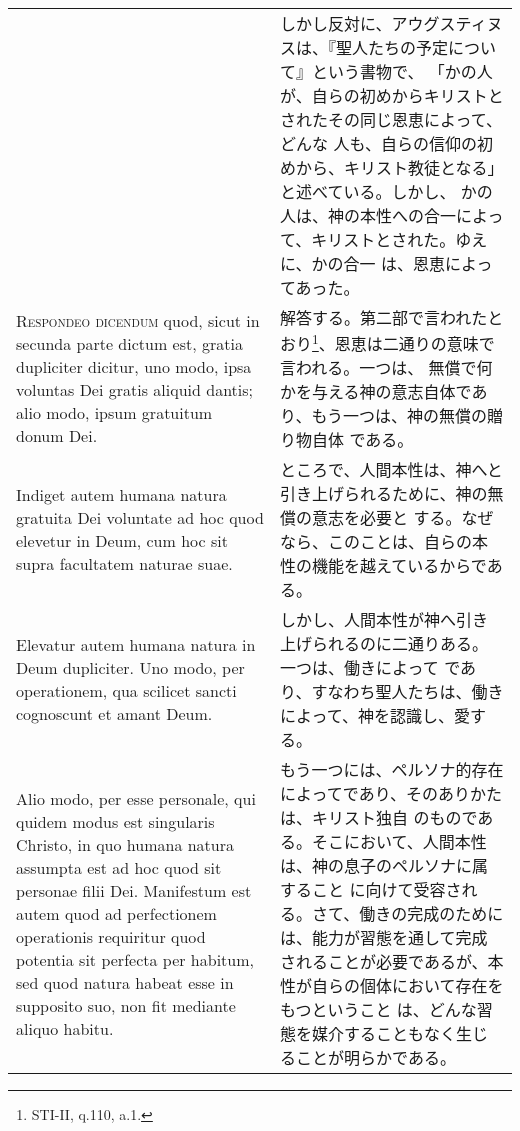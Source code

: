 \documentclass[10pt]{jsarticle} %
\begin{document}
\begin{longtable}{p{21em}p{21em}}
&

しかし反対に、アウグスティヌスは、『聖人たちの予定について』という書物で、
 「かの人が、自らの初めからキリストとされたその同じ恩恵によって、どんな
 人も、自らの信仰の初めから、キリスト教徒となる」と述べている。しかし、
 かの人は、神の本性への合一によって、キリストとされた。ゆえに、かの合一
 は、恩恵によってあった。

\\



{\scshape Respondeo dicendum} quod, sicut in secunda parte dictum est, gratia
dupliciter dicitur, uno modo, ipsa voluntas Dei gratis aliquid dantis;
alio modo, ipsum gratuitum donum Dei. 

&

解答する。第二部で言われたとおり\footnote{STI-II, q.110, a.1.}、恩恵は二通りの意味で言われる。一つは、
 無償で何かを与える神の意志自体であり、もう一つは、神の無償の贈り物自体
 である。


\\

Indiget autem humana natura
gratuita Dei voluntate ad hoc quod elevetur in Deum, cum hoc sit supra
facultatem naturae suae. 

&

ところで、人間本性は、神へと引き上げられるために、神の無償の意志を必要と
 する。なぜなら、このことは、自らの本性の機能を越えているからである。

\\

Elevatur autem humana natura in Deum
dupliciter. Uno modo, per operationem, qua scilicet sancti cognoscunt et
amant Deum. 

&

しかし、人間本性が神へ引き上げられるのに二通りある。一つは、働きによって
 であり、すなわち聖人たちは、働きによって、神を認識し、愛する。

\\

Alio modo, per esse personale, qui quidem modus est
singularis Christo, in quo humana natura assumpta est ad hoc quod sit
personae filii Dei. Manifestum est autem quod ad perfectionem
operationis requiritur quod potentia sit perfecta per habitum, sed quod
natura habeat esse in supposito suo, non fit mediante aliquo habitu. 

&


もう一つには、ペルソナ的存在によってであり、そのありかたは、キリスト独自
 のものである。そこにおいて、人間本性は、神の息子のペルソナに属すること
 に向けて受容される。さて、働きの完成のためには、能力が習態を通して完成
 されることが必要であるが、本性が自らの個体において存在をもつということ
 は、どんな習態を媒介することもなく生じることが明らかである。


\end{longtable}
\end{document}
